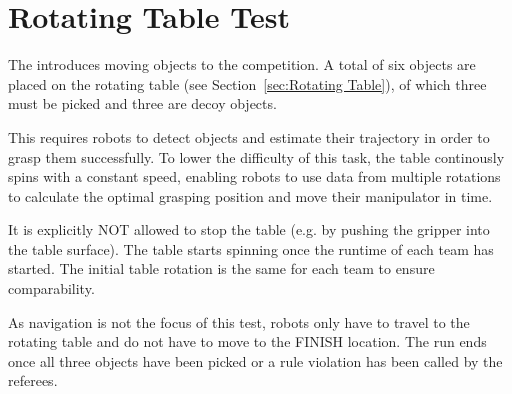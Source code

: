 \section{Rotating Table Test}
\label{sec:Rotating Table Test}

The  introduces moving objects to the competition.
A total of six objects are placed on the rotating table (see Section~\ref{sec:Rotating Table}), of which three must be picked and three are decoy objects.

This requires robots to detect objects and estimate their trajectory in order to grasp them successfully.
To lower the difficulty of this task, the table continously spins with a constant speed, enabling robots to use data from multiple rotations to calculate the optimal grasping position and move their manipulator in time.

It is explicitly NOT allowed to stop the table (e.g. by pushing the gripper into the table surface).
The table starts spinning once the runtime of each team has started.
The initial table rotation is the same for each team to ensure comparability.  

As navigation is not the focus of this test, robots only have to travel to the rotating table and do not have to move to the FINISH location. The run ends once all three objects have been picked or a rule violation has been called by the referees.



